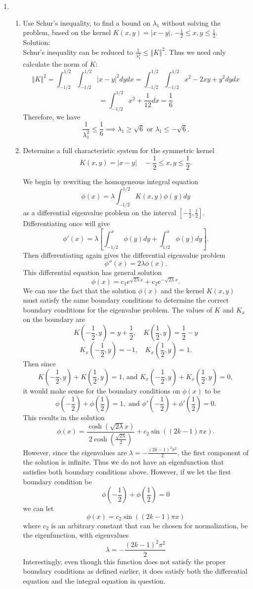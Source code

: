 \documentclass[12pt]{article}
\numberwithin{equation}{section}
\newcommand{\abs}[1]{\left\vert#1\right\vert}
\newcommand{\norm}[1]{\left\Vert#1\right\Vert}
\begin{document}
\begin{enumerate}
    \item \begin{enumerate}\item
    Use Schur's inequality, to find a bound on $\lambda_1$ without solving the problem, based on the kernel $K(x,y)=\abs{x-y}$, $-\frac{1}{2}\leq x,y\leq\frac{1}{2}.$\\

    Solution:\\

    Schur's inequality can be reduced to $\frac{1}{\lambda_1^2}\leq \norm{K}^2$. Thus we need only calculate the norm of $K$:
    $$\norm{K}^2=\int_{-1/2}^{1/2}\int_{-1/2}^{1/2}\abs{x-y}^2dydx=\int_{-1/2}^{1/2}\int_{-1/2}^{1/2}x^2-2xy+y^2dydx$$
    $$=\int_{-1/2}^{1/2}x^2+\frac{1}{12}dx=\frac{1}{6}$$
    Therefore, we have
    $$\frac{1}{\lambda_1^2}\leq \frac{1}{6}\implies \lambda_1\geq \sqrt{6}\text{  or  }\lambda_1\leq -\sqrt{6}.$$

    \item Determine a full characteristic system for the symmetric kernel
    $$K(x,y)=\abs{x-y}\quad-\frac{1}{2}\leq x,y\leq\frac{1}{2}.$$

    We begin by rewriting the homogeneous integral equation
    $$\phi(x)=\lambda\int_{-1/2}^{1/2}K(x,y)\phi(y)dy$$
    as a differential eigenvalue problem on the interval $[-\frac{1}{2},\frac{1}{2}]$.
    Differentiating once will give
    $$\phi'(x)=\lambda[\int_{-1/2}^x\phi(y)dy+\int_{1/2}^x\phi(y)dy].$$
    Then differentiating again gives the differential eigenvalue problem
    $$\phi''(x)=2\lambda\phi(x).$$
    This differential equation has general solution
    $$\phi(x)=c_1e^{\sqrt{2\lambda}x}+c_2e^{-\sqrt{2\lambda}x}.$$
    We can use the fact that the solution $\phi(x)$ and the kernel $K(x,y)$ must satisfy the same boundary conditions to determine the correct boundary conditions for the eigenvalue problem. The values of $K$ and $K_x$ on the boundary are
    $$K(-\frac{1}{2},y)=y+\frac{1}{2},\quad K(\frac{1}{2},y)=\frac{1}{2}-y$$
    $$K_x(-\frac{1}{2},y)=-1,\quad K_x(\frac{1}{2},y)=1.$$
    Then since
    $$K(-\frac{1}{2},y)+K(\frac{1}{2},y)=1\text{,  and  }K_x(-\frac{1}{2},y)+K_x(\frac{1}{2},y)=0,$$
    it would make sense for the boundary conditions on $\phi(x)$ to be
    $$\phi(-\frac{1}{2})+\phi(\frac{1}{2})=1,\text{ and }\phi'(-\frac{1}{2})+\phi'(\frac{1}{2})=0.$$
    This results in the solution
    $$\phi(x)=\frac{\cosh(\sqrt{2\lambda}x)}{2\cosh(\frac{\sqrt{2\lambda}}{2})}+c_2\sin((2k-1)\pi x).$$
    However, since the eigenvalues are $\lambda=-\frac{(2k-1)^2\pi^2}{2}$, the first component of the solution is infinite. Thus we do not have an eigenfunction that satisfies both boundary conditions above. However, if we let the first boundary condition be
    $$\phi(-\frac{1}{2})+\phi(\frac{1}{2})=0$$
    we can let
    $$\phi(x)=c_2\sin((2k-1)\pi x)$$
    where $c_2$ is an arbitrary constant that can be chosen for normalization, be the eigenfunction, with eigenvalues
    $$\lambda=-\frac{(2k-1)^2\pi^2}{2}$$
    Interestingly, even though this function does not satisfy the proper boundary conditions as defined earlier, it does satisfy both the differential equation and the integral equation in question.
    

\end{enumerate}
\end{enumerate}
\end{document}
